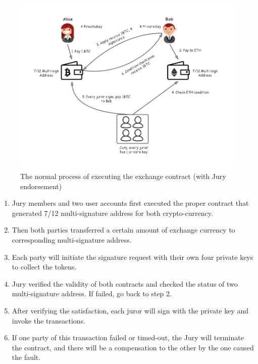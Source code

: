 \begin{figure}[H]
    \includegraphics[width=1\textwidth]{./figures/jury.png}
    \centering
    \caption{The normal process of executing the exchange contract (with Jury endorsement)}
    \label{fig:jury}
    \centering
\end{figure}
\begin{enumerate}
    \item Jury members and two user accounts first executed the proper contract that generated 7/12 multi-signature address for both crypto-currency.
    \item Then both parties transferred a certain amount of exchange currency to corresponding multi-signature address.
    \item Each party will initiate the signature request with their own four private keys to collect the tokens.
    \item Jury verified the validity of both contracts and checked the status of two multi-signature address. If failed, go back to step 2.
    \item After verifying the satisfaction, each juror will sign with the private key and invoke the transactions.
    \item If one party of this transaction failed or timed-out, the Jury will terminate the contract, and there will be a compensation to the other by the one caused the fault.
\end{enumerate}
